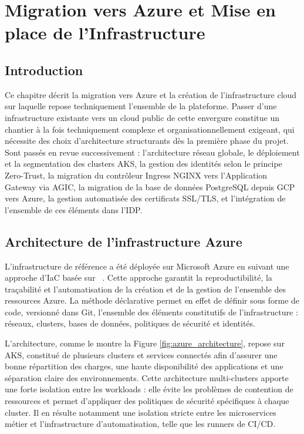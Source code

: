 \chapter{Migration vers Azure et Mise en place de l'Infrastructure}
\label{chap:azure}

\section*{Introduction}

\noindent Ce chapitre décrit la migration vers Azure et la création de l'infrastructure cloud sur laquelle repose techniquement l'ensemble de la plateforme. Passer d'une infrastructure existante vers un cloud public de cette envergure constitue un chantier à la fois techniquement complexe et organisationnellement exigeant, qui nécessite des choix d'architecture structurants dès la première phase du projet. Sont passés en revue successivement : l'architecture réseau globale, le déploiement et la segmentation des clusters \ac{AKS}, la gestion des identités selon le principe Zero-Trust, la migration du contrôleur Ingress NGINX vers l'Application Gateway via \ac{AGIC}, la migration de la base de données PostgreSQL depuis \ac{GCP} vers Azure, la gestion automatisée des certificats SSL/TLS, et l'intégration de l'ensemble de ces éléments dans l'\ac{IDP}.

\section{Architecture de l'infrastructure Azure}
\label{sec:architecture_reseau}

\noindent L'infrastructure de référence a été déployée sur Microsoft Azure en suivant une approche d'\acf{IaC} basée sur ~\cite{hashicorp2023terraform}. Cette approche garantit la reproductibilité, la traçabilité et l'automatisation de la création et de la gestion de l'ensemble des ressources Azure. La méthode déclarative permet en effet de définir sous forme de code, versionné dans Git, l'ensemble des éléments constitutifs de l'infrastructure : réseaux, clusters, bases de données, politiques de sécurité et identités.

L'architecture, comme le montre la Figure \ref{fig:azure_architecture}, repose sur \ac{AKS}, constitué de plusieurs clusters et services connectés afin d'assurer une bonne répartition des charges, une haute disponibilité des applications et une séparation claire des environnements. Cette architecture multi-clusters apporte une forte isolation entre les workloads : elle évite les problèmes de contention de ressources et permet d'appliquer des politiques de sécurité spécifiques à chaque cluster. Il en résulte notamment une isolation stricte entre les microservices métier et l'infrastructure d'automatisation, telle que les runners de \ac{CI/CD}.

